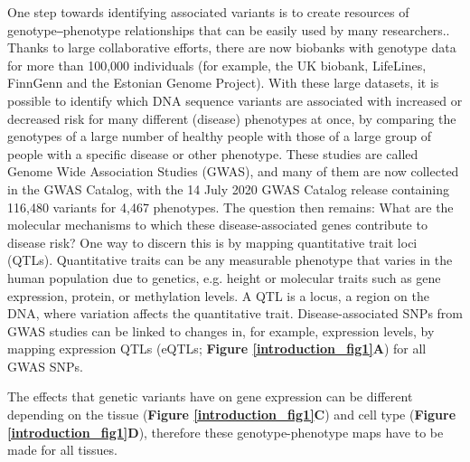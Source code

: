 One step towards identifying associated variants is to create resources of genotype‒phenotype relationships that can be easily used by many researchers.\cite{claussnitzerBriefHistoryHuman2020}. Thanks to large collaborative efforts, there are now biobanks with genotype data for more than 100,000 individuals (for example, the UK biobank\cite{sudlowUKBiobankOpen2015}, LifeLines\cite{scholtensCohortProfileLifeLines2015}, FinnGenn\cite{fingennFinnGenDocumentationR32020} and the Estonian Genome Project\cite{leitsaluCohortProfileEstonian2015}). With these large datasets, it is possible to identify which DNA sequence variants are associated with increased or decreased risk for many different (disease) phenotypes at once, by comparing the genotypes of a large number of healthy people with those of a large group of people with a specific disease or other phenotype. These studies are called Genome Wide Association Studies (GWAS), and many of them are now collected in the GWAS Catalog\cite{bunielloNHGRIEBIGWASCatalog2019}, with the 14 July 2020 GWAS Catalog release containing 116,480 variants for 4,467 phenotypes. The question then remains: What are the molecular mechanisms to which these disease-associated genes contribute to disease risk? One way to discern this is by mapping quantitative trait loci\cite{membersofthecomplextraitconsortiumNatureIdentificationQuantitative2003} (QTLs). Quantitative traits can be any measurable phenotype that varies in the human population due to genetics, e.g. height or molecular traits such as gene expression, protein, or methylation levels. A QTL is a locus, a region on the DNA, where variation affects the quantitative trait. Disease-associated SNPs from GWAS studies can be linked to changes in, for example, expression levels, by mapping expression QTLs (eQTLs; \textbf{Figure \ref{introduction_fig1}A}) for all GWAS SNPs.


The effects that genetic variants have on gene expression can be different depending on the tissue (\textbf{Figure \ref{introduction_fig1}C}) and cell type (\textbf{Figure \ref{introduction_fig1}D}), therefore these genotype-phenotype maps have to be made for all tissues. 


